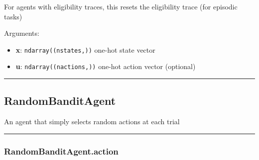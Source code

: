 \begin{Shaded}
\begin{Highlighting}[]
\OperatorTok{=}\NormalTok{)}
\end{Highlighting}
\end{Shaded}

For agents with eligibility traces, this resets the eligibility trace
(for episodic tasks)

Arguments:

\begin{itemize}
\tightlist
\item
  \textbf{x}: \texttt{ndarray((nstates,))} one-hot state vector
\item
  \textbf{u}: \texttt{ndarray((nactions,))} one-hot action vector
  (optional)
\end{itemize}

\begin{center}\rule{0.5\linewidth}{\linethickness}\end{center}

\subsection{RandomBanditAgent}\label{randombanditagent}

\begin{Shaded}
\begin{Highlighting}[]
\end{Highlighting}
\end{Shaded}

An agent that simply selects random actions at each trial

\begin{center}\rule{0.5\linewidth}{\linethickness}\end{center}

\subsubsection{RandomBanditAgent.action}\label{randombanditagent.action}

\begin{Shaded}
\begin{Highlighting}[]
\end{Highlighting}
\end{Shaded}

